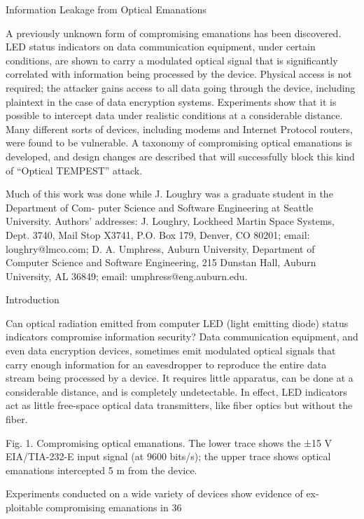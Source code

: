 Information Leakage from Optical Emanations

A previously unknown form of compromising emanations has been discovered. LED status indicators on data communication equipment, under certain conditions, are shown to carry a modulated optical signal that is significantly correlated with information being processed by the device. Physical access is not required; the attacker gains access to all data going through the device, including plaintext in the case of data encryption systems. Experiments show that it is possible to intercept data under realistic conditions at a considerable distance. Many different sorts of devices, including modems and Internet Protocol routers, were found to be vulnerable. A taxonomy of compromising optical emanations is developed, and design changes are described that will successfully block this kind of ``Optical TEMPEST'' attack.

Much of this work was done while J. Loughry was a graduate student in the Department of Com- puter Science and Software Engineering at Seattle University.
Authors’ addresses: J. Loughry, Lockheed Martin Space Systems, Dept. 3740, Mail Stop X3741, P.O. Box 179, Denver, CO 80201; email: loughry@lmco.com; D. A. Umphress, Auburn University, Department of Computer Science and Software Engineering, 215 Dunstan Hall, Auburn University, AL 36849; email: umphress@eng.auburn.edu.

Introduction

Can optical radiation emitted from computer LED (light emitting diode) status indicators compromise information security? Data communication equipment, and even data encryption devices, sometimes emit modulated optical signals that carry enough information for an eavesdropper to reproduce the entire data stream being processed by a device. It requires little apparatus, can be done at a considerable distance, and is completely undetectable. In effect, LED indicators act as little free-space optical data transmitters, like fiber optics but without the fiber.

Fig. 1. Compromising optical emanations. The lower trace shows the ±15 V EIA/TIA-232-E input signal (at 9600 bits/s); the upper trace shows optical emanations intercepted 5 m from the device.

Experiments conducted on a wide variety of devices show evidence of ex- ploitable compromising emanations in 36%

